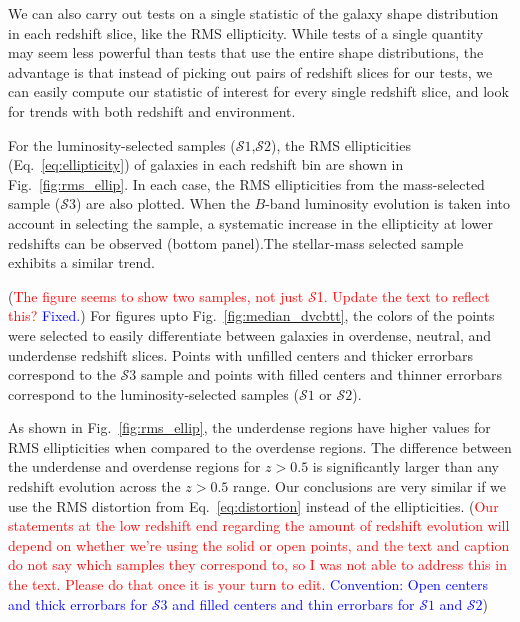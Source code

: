 \documentclass[twocolumn,useAMS,usenatbib]{mn2e}
\newcommand{\rachel}[1]{{\textcolor{red}{#1}}}
\newcommand{\arun}[1]{{\textcolor{blue}{#1}}}
\newcommand{\s}{\ensuremath{\mathcal{S}}}
\begin{document}
We can also carry out tests on a single statistic of the galaxy shape
distribution in each redshift slice, like the RMS ellipticity.  While
tests of a single quantity may seem less powerful than tests that use
the entire shape distributions, the advantage is that instead of
picking out pairs of redshift slices for our tests, we can easily compute our
statistic of interest for every single redshift slice, and look for
trends with both redshift and environment.

For the luminosity-selected samples (\s$1$,\s$2$), the
RMS ellipticities (Eq.~\eqref{eq:ellipticity}) of galaxies in each redshift bin are shown
in Fig.~\ref{fig:rms_ellip}. In each case, the RMS ellipticities from the mass-selected sample (\s$3$) are also plotted.
When the $B$-band luminosity evolution is taken into account in selecting the sample, a systematic increase in the ellipticity at
lower redshifts can be observed (bottom panel).The stellar-mass selected sample exhibits a similar trend.

(\rachel{The figure seems to show two  samples, not just \s1.  Update the text to reflect this?} \arun{Fixed.}) 
For figures upto Fig.~\ref{fig:median_dvcbtt}, the colors of the points were selected to easily differentiate between galaxies in overdense, neutral, and underdense redshift slices.
Points with unfilled centers and thicker errorbars correspond to the \s$3$ sample and points with filled centers and thinner errorbars correspond to the luminosity-selected samples (\s$1$ or \s$2$).

As shown in Fig.~\ref{fig:rms_ellip}, the underdense regions have  higher values for RMS ellipticities when compared to the
overdense regions. The difference between the underdense and overdense
regions for $z>0.5$ is significantly larger than any redshift
evolution across the $z>0.5$ range.  
Our conclusions are very similar if we use the RMS distortion from Eq.~\eqref{eq:distortion} instead
of the ellipticities. (\rachel{Our statements at the low redshift end
  regarding the amount of redshift evolution will depend on whether
  we're using the solid or open points, and the text and caption do
  not say which samples they correspond to, so I was not able to
  address this in the text.  Please do that once it is your turn to edit.} 
  \arun{Convention: Open centers and thick errorbars for \s$3$ and filled centers and thin errorbars for \s$1$ and \s$2$})
\end{document}
